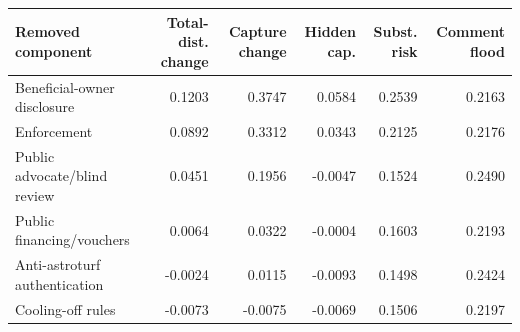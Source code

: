 \begingroup
\begin{center}
\begin{minipage}{\textwidth}
\centering
\footnotesize
\setlength{\tabcolsep}{3pt}
\begin{tabular*}{\textwidth}{@{\extracolsep{\fill}}lrrrrr@{}}
\toprule
Removed component & Total-dist. change & Capture change & Hidden cap. & Subst. risk & Comment flood \\
\midrule
Beneficial-owner disclosure & 0.1203 & 0.3747 & 0.0584 & 0.2539 & 0.2163 \\
Enforcement & 0.0892 & 0.3312 & 0.0343 & 0.2125 & 0.2176 \\
Public advocate/blind review & 0.0451 & 0.1956 & -0.0047 & 0.1524 & 0.2490 \\
Public financing/vouchers & 0.0064 & 0.0322 & -0.0004 & 0.1603 & 0.2193 \\
Anti-astroturf authentication & -0.0024 & 0.0115 & -0.0093 & 0.1498 & 0.2424 \\
Cooling-off rules & -0.0073 & -0.0075 & -0.0069 & 0.1506 & 0.2197 \\
\bottomrule
\end{tabular*}
\par\smallskip
\captionsetup{hypcap=false}
\label{tab:ablation}
\end{minipage}
\end{center}
\endgroup
